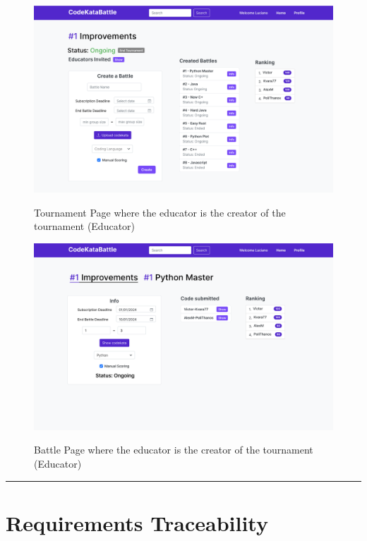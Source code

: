 \documentclass{Configuration_Files/Template}
\begin{document}
\begin{figure}[H]
\centering
\includegraphics[scale = 0.25]{DD_latex/Images/UI/TournamentPage_EducatorCreator.png}\\
\caption{Tournament Page where the educator is the creator of the tournament (Educator)}
\end{figure}

\begin{figure}[H]
\centering
\includegraphics[scale = 0.25]{DD_latex/Images/UI/BattlePage_EducatorCreator.png}\\
\caption{Battle Page where the educator is the creator of the tournament (Educator)}
\end{figure}

{\color{bluepoli}\rule{\linewidth}{0.1pt}}

\chapter{Requirements Traceability}
\end{document}
